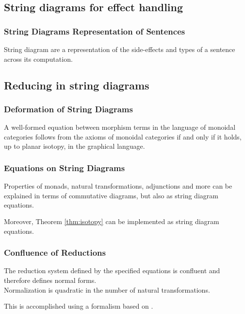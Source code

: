 \documentclass[math, english, info]{beamercours}
\begin{document}
\subsection{String diagrams for effect handling}
\begin{frame}
	\frametitle{String Diagrams Representation of Sentences}
	String diagram are a representation of the side-effects and types of a
	sentence across its computation.
	\begin{center}
	\end{center}

\end{frame}

\subsection{Reducing in string diagrams}
\begin{frame}
	\frametitle{Deformation of String Diagrams}
	\begin{thm}
		\label{thm:isotopy}
		A well-formed equation between morphism terms in the language of monoidal
		categories follows from the axioms of monoidal categories if and only if it
		holds, up to planar isotopy, in the graphical language.
	\end{thm}
\end{frame}

\begin{frame}
	\frametitle{Equations on String Diagrams}
	Properties of monads, natural transformations, adjunctions
	and more can be explained in terms of commutative diagrams, but also as
	string diagram equations.

	Moreover, Theorem \ref{thm:isotopy} can be implemented as string diagram
	equations.
\end{frame}

\begin{frame}
	\frametitle{Confluence of Reductions}
	\begin{thm}[Confluence]
		The reduction system defined by the specified equations is confluent and
		therefore defines normal forms.\\
		Normalization is quadratic in the number of natural transformations.
	\end{thm}

	\smallskip

	This is accomplished using a formalism based on \cite{delpeuchNormalizationPlanarString2022}.
\end{frame}
\end{document}
